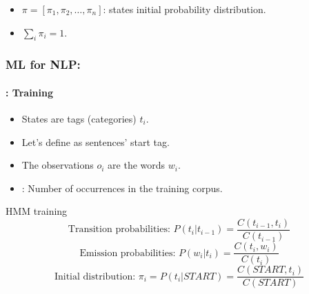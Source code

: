 \documentclass[xcolor=table]{beamer}
\begin{document}
\begin{frame}
\begin{minipage}{.45\textwidth}
		\end{minipage}
		
		\begin{itemize}
			\item $\pi = [\pi_1, \pi_2, \ldots, \pi_n ]$: states initial probability distribution.
			\item $\sum_i \pi_i = 1$.
		\end{itemize}
		
	\end{frame}
	
	\begin{frame}
		\frametitle{ML for NLP: \insertsection}
		\framesubtitle{\insertsubsection: Training}
		
		\begin{itemize}
			\item States are tags (categories) $t_i$.
			\item Let's define  as sentences' start tag.
			\item The observations $o_i$ are the words $w_i$.
			\item {}: Number of occurrences in the training corpus.
		\end{itemize}
		
		\begin{block}{HMM training}
			\[
			\text{Transition probabilities: } P(t_i | t_{i-1}) = \frac{C(t_{i-1}, t_i)}{C(t_{i-1})} 
			\]\[
			\text{Emission probabilities: } P(w_i | t_i) = \frac{C(t_i, w_i)}{C(t_i)}
			\]\[
			\text{Initial distribution: } \pi_i = P(t_i | START) = \frac{C(START, t_i)}{C(START)}
			\]
		\end{block}
	\end{frame}
	
\end{document}
